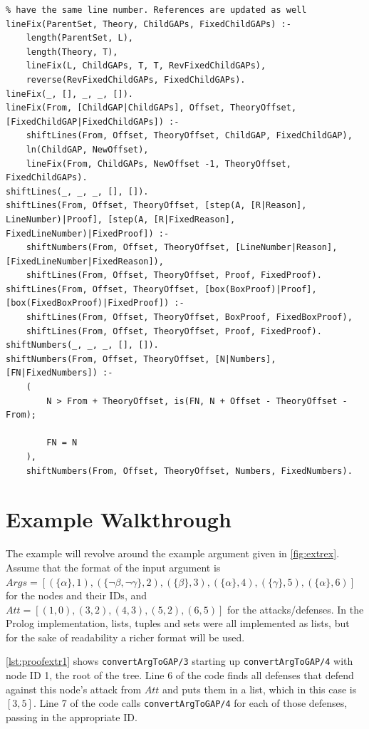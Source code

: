 \documentclass[11pt,twoside,a4paper]{report}
\begin{document}
\begin{lstlisting}[caption={Third part of the proof extraction algorithm},label=lst:proofextr3]
% Changes the lines of the proofs of the child proofs so that no two steps
% have the same line number. References are updated as well
lineFix(ParentSet, Theory, ChildGAPs, FixedChildGAPs) :-
	length(ParentSet, L),
	length(Theory, T),
	lineFix(L, ChildGAPs, T, T, RevFixedChildGAPs),
	reverse(RevFixedChildGAPs, FixedChildGAPs).
lineFix(_, [], _, _, []).
lineFix(From, [ChildGAP|ChildGAPs], Offset, TheoryOffset, [FixedChildGAP|FixedChildGAPs]) :-
	shiftLines(From, Offset, TheoryOffset, ChildGAP, FixedChildGAP),
	ln(ChildGAP, NewOffset),
	lineFix(From, ChildGAPs, NewOffset -1, TheoryOffset, FixedChildGAPs).
shiftLines(_, _, _, [], []).
shiftLines(From, Offset, TheoryOffset, [step(A, [R|Reason], LineNumber)|Proof], [step(A, [R|FixedReason], FixedLineNumber)|FixedProof]) :-
	shiftNumbers(From, Offset, TheoryOffset, [LineNumber|Reason], [FixedLineNumber|FixedReason]),
	shiftLines(From, Offset, TheoryOffset, Proof, FixedProof).
shiftLines(From, Offset, TheoryOffset, [box(BoxProof)|Proof], [box(FixedBoxProof)|FixedProof]) :-
	shiftLines(From, Offset, TheoryOffset, BoxProof, FixedBoxProof),
	shiftLines(From, Offset, TheoryOffset, Proof, FixedProof).
shiftNumbers(_, _, _, [], []).
shiftNumbers(From, Offset, TheoryOffset, [N|Numbers], [FN|FixedNumbers]) :-
	(
		N > From + TheoryOffset, is(FN, N + Offset - TheoryOffset - From);
		
		FN = N
	),
	shiftNumbers(From, Offset, TheoryOffset, Numbers, FixedNumbers).
\end{lstlisting}

\section{Example Walkthrough}
The example will revolve around the example argument given in \autoref{fig:extrex}. Assume that the format of the input argument is $Args = [(\{\alpha\}, 1), (\{\neg\beta, \neg\gamma\}, 2), (\{\beta\}, 3), (\{\alpha\}, 4), (\{\gamma\}, 5), (\{\alpha\}, 6)]$ for the nodes and their IDs, and $Att = [(1, 0), (3, 2), (4, 3), (5, 2), (6, 5)]$ for the attacks/defenses. In the Prolog implementation, lists, tuples and sets were all implemented as lists, but for the sake of readability a richer format will be used.

\autoref{lst:proofextr1} shows \lstinline$convertArgToGAP/3$ starting up \lstinline$convertArgToGAP/4$ with node ID 1, the root of the tree. Line 6 of the code finds all defenses that defend against this node's attack from $Att$ and puts them in a list, which in this case is $[3, 5]$. Line 7 of the code calls \lstinline$convertArgToGAP/4$ for each of those defenses, passing in the appropriate ID.
\end{document}
